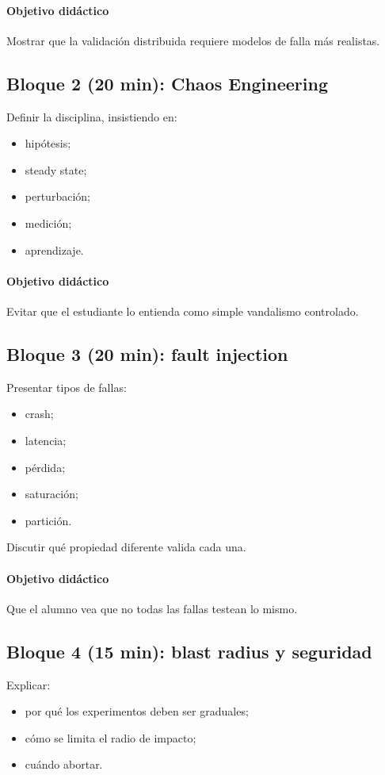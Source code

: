 \documentclass[variant=docente,cover=institutional,mode=screen]{ua-engineering-v6-article}
\begin{document}
\paragraph{Objetivo didáctico}
Mostrar que la validación distribuida requiere modelos de falla más realistas.

\subsection*{Bloque 2 (20 min): Chaos Engineering}
Definir la disciplina, insistiendo en:
\begin{itemize}
\item hipótesis;
\item steady state;
\item perturbación;
\item medición;
\item aprendizaje.
\end{itemize}

\paragraph{Objetivo didáctico}
Evitar que el estudiante lo entienda como simple vandalismo controlado.

\subsection*{Bloque 3 (20 min): fault injection}
Presentar tipos de fallas:
\begin{itemize}
\item crash;
\item latencia;
\item pérdida;
\item saturación;
\item partición.
\end{itemize}

Discutir qué propiedad diferente valida cada una.

\paragraph{Objetivo didáctico}
Que el alumno vea que no todas las fallas testean lo mismo.

\subsection*{Bloque 4 (15 min): blast radius y seguridad}
Explicar:
\begin{itemize}
\item por qué los experimentos deben ser graduales;
\item cómo se limita el radio de impacto;
\item cuándo abortar.
\end{itemize}
\end{document}
